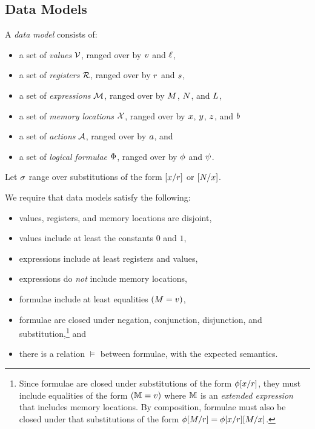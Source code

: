 
\subsection{Data Models}
\label{sec:data:models}
A \emph{data model} consists of:
\begin{itemize}
\item a set of \emph{values} $\mathcal{V}$, ranged over by
  $v$ and $\ell$,
\item a set of \emph{registers} $\mathcal{R}$, ranged over by
  $r$ and $s$,
\item a set of \emph{expressions} $\mathcal{M}$, ranged over by
  $M$, $N$, and $L$, %
\item a set of \emph{memory locations} $\mathcal{X}$, ranged over by $x$,
  $y$, $z$, and $b$
\item a set of \emph{actions} $\mathcal{A}$, ranged over by $a$, and %
\item a set of \emph{logical formulae} $\Phi$, ranged over by
  $\phi$ and $\psi$.
\end{itemize}

Let $\sigma$ range over substitutions of the form
$[x/r]$ or $[N/x]$.

We require that data models satisfy the following:
\begin{itemize}
\item values, registers, and memory locations are disjoint,
\item values include at least the constants $0$ and $1$,
\item expressions include at least registers and values,
\item expressions do \emph{not} include memory locations, %
\item formulae include at least %
  equalities %
  $(M=v)$, %
\item formulae are closed under negation, conjunction, disjunction, and
  substitution,\!\footnote{Since formulae are closed under substitutions of the
    form $\phi[x/r]$, they must include equalities of the form
    $(\mathbb{M}=v)$ where $\mathbb{M}$ is an \emph{extended expression} that
    includes memory locations.  By composition, formulae must also be closed
    under that substitutions of the form
    $\phi[M/r]=\phi[x/r][M/x]$.} and
\item there is a relation $\vDash$ between formulae, with the expected semantics.
\end{itemize}

